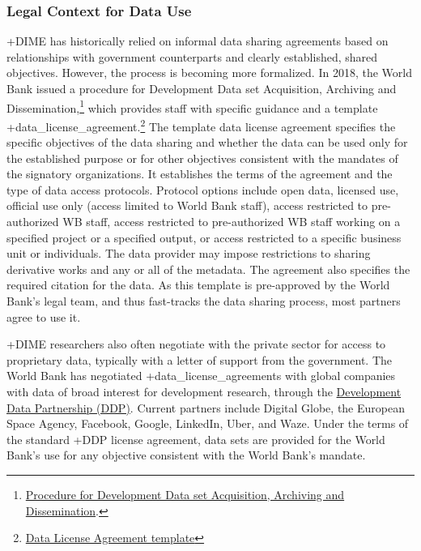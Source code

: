 \documentclass[
]{WileySix}
\begin{document}
\hypertarget{legal-context-for-data-use-7}{%
\subsubsection{Legal Context for Data Use}\label{legal-context-for-data-use-7}}

+DIME\textbar{} has historically relied on informal data sharing agreements based on relationships with government counterparts and clearly established, shared objectives. However, the process is becoming more formalized. In 2018, the World Bank issued a procedure for Development Data set Acquisition, Archiving and Dissemination,\footnote{\href{https://policies.worldbank.org/sites/ppf3/PPFDocuments/17edbe3e480a4ee491d7c6a4e2ae9f32.pdf}{Procedure for Development Data set Acquisition, Archiving and Dissemination}.} which provides staff with specific guidance and a template +data\_license\_agreement\textbar.\footnote{\href{https://worldbankgroup.sharepoint.com/teams/ddh/SiteAssets/SitePages/ddh/DataLicenseAgreementTemplate_v4.pdf}{Data License Agreement template}} The template data license agreement specifies the specific objectives of the data sharing and whether the data can be used only for the established purpose or for other objectives consistent with the mandates of the signatory organizations. It establishes the terms of the agreement and the type of data access protocols. Protocol options include open data, licensed use, official use only (access limited to World Bank staff), access restricted to pre-authorized WB staff, access restricted to pre-authorized WB staff working on a specified project or a specified output, or access restricted to a specific business unit or individuals. The data provider may impose restrictions to sharing derivative works and any or all of the metadata. The agreement also specifies the required citation for the data. As this template is pre-approved by the World Bank's legal team, and thus fast-tracks the data sharing process, most partners agree to use it.

+DIME\textbar{} researchers also often negotiate with the private sector for access to proprietary data, typically with a letter of support from the government. The World Bank has negotiated +data\_license\_agreements\textbar{} with global companies with data of broad interest for development research, through the \href{https://datapartnership.org/}{Development Data Partnership (DDP)}. Current partners include Digital Globe, the European Space Agency, Facebook, Google, LinkedIn, Uber, and Waze. Under the terms of the standard +DDP\textbar{} license agreement, data sets are provided for the World Bank's use for any objective consistent with the World Bank's mandate.
\end{document}

